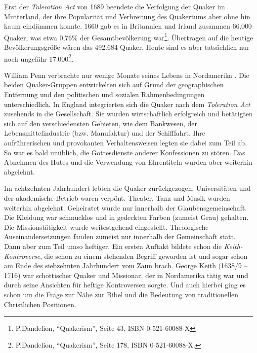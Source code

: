 \medskip

Erst der \textit{Toleration Act} von 1689 beendete die
Verfolgung der Quaker im
Mutterland, der ihre Popularität und Verbreitung des Quakertums aber ohne hin
kaum eindämmen konnte.
 1660 gab
es in Britannien und Irland
zusammen
66.000 Quaker, was etwa 0,76\% der
Gesamtbevölkerung war\footnote{P.Dandelion, "`Quakerism"', Seite 43, ISBN
0-521-60088-X}. Übertragen auf die heutige Bevölkerungsgröße wären das 492.684
Quaker. Heute sind es aber tatsächlich nur noch ungefähr
17.000\footnote{P.Dandelion, "`Quakerism"', Seite 178, ISBN 0-521-60088-X.}.

\medskip

William Penn verbrachte nur wenige Monate seines Lebens in Nordamerika
. Die beiden
Quaker-Gruppen entwickelten sich auf Grund der geographischen Entfernung und den
politischen und sozialen Rahmenbedingungen unterschiedlich. In
England integrierten sich die Quaker nach dem \textit{Toleration Act} zusehends
in die Gesellschaft. Sie wurden wirtschaftlich
erfolgreich und betätigten sich
auf den verschiedensten Gebieten, wie dem Bankwesen, der
Lebensmittelindustrie
(bzw. Manufaktur) und der Schifffahrt. Ihre aufrührerischen und provokanten
Verhaltensweisen legten sie dabei zum Teil ab. So war es bald unüblich, die
Gottesdienste anderer Konfessionen
 zu stören. Das Abnehmen des Hutes und die
Verwendung von Ehrentiteln wurden aber weiterhin abgelehnt.

\medskip

Im achtzehnten Jahrhundert lebten die Quaker zurückgezogen.
Universitäten und der akademische Betrieb waren verpönt.
 Theater, Tanz und Musik
wurden weiterhin abgelehnt. Geheiratet wurde nur innerhalb der
Glaubensgemeinschaft. Die Kleidung war schmucklos und in
gedeckten Farben
(zumeist Grau) gehalten. Die Missionstätigkeit wurde weitestgehend eingestellt.
Theologische Auseinandersetzungen fanden zumeist nur innerhalb der Gemeinschaft
statt. Dann aber zum Teil umso heftiger. Ein ersten Auftakt bildete schon die
\textit{Keith-Kontroverse}, die schon zu einem
stehenden Begriff geworden ist und sogar schon am Ende des siebzehnten Jahrhundert
vom Zaun brach. George Keith (1638/9 -- 1716)
war schottischer
Quaker und Missionar, der in
Nordamerika tätig war und durch seine Ansichten für heftige Kontroversen
sorgte. Und auch hierbei ging es schon um die Frage zur Nähe zur Bibel und die
Bedeutung von traditionellen Christlichen Positionen.

